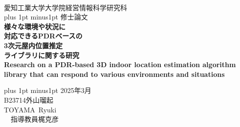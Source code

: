 \begin{titlepage}
    \begin{center}


        \ \vspace{19mm}

        \LARGE\baselineskip=13mm
        愛知工業大学大学院経営情報科学研究科 \\
        \kanjiskip=12pt plus 1pt minus1pt
        修士論文 \\[1mm]

        {\Huge\baselineskip=13mm
        \textbf{様々な環境や状況に\\対応できるPDRベースの\\3次元屋内位置推定\\ライブラリに関する研究} \\
        \textbf{
Research on a PDR-based 3D indoor location estimation algorithm library that can respond to various environments and situations} \\
        }

        \vspace{30mm}

        \kanjiskip=9pt plus 1pt minus1pt
        2025年3月 \\
        B23714\hspace{1zw}外山瑠起 \\
        TOYAMA\ Ryuki \\
        \ \hbox{\kanjiskip=0pt 指導教員}\hspace{1zw}梶克彦\hspace{1zw}

    \end{center}
\end{titlepage}

